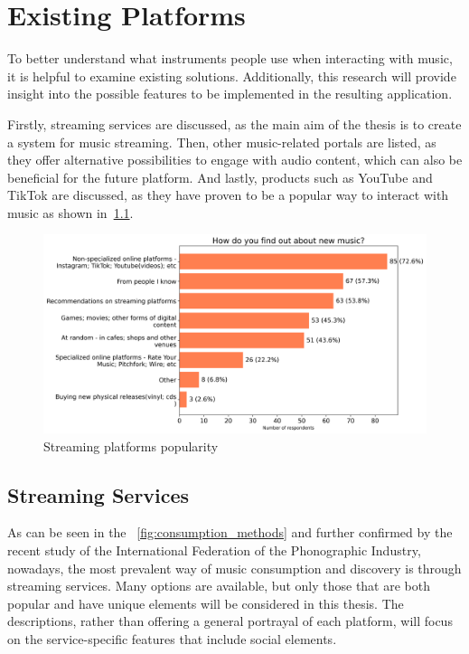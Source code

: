 \chapter{Existing Platforms}\label{chap:platforms}

To better understand what instruments people use when interacting with music,
it is helpful to examine existing solutions. Additionally, this research will provide insight
into the possible features to be implemented in the resulting application.

Firstly, streaming services are discussed, as the main aim of the thesis is to create a system for music streaming.
Then, other music-related portals are listed, as they offer alternative possibilities to engage with audio content, which
can also be beneficial for the future platform.
And lastly, products such as YouTube and TikTok are discussed, as they have proven to be a popular way to interact
with music as shown in~\ref{fig:discovery_methods}.

\begin{figure}[htbp]
    \centering
    \includegraphics[height=0.4\textheight]{charts/discovery methods.png}
    \caption{Streaming platforms popularity}
    \label{fig:discovery_methods}
\end{figure}


\section{Streaming Services}
As can be seen in the ~\ref{fig:consumption_methods} and further confirmed by
the recent study of the International Federation of the Phonographic Industry\cite{music_stats_2024},
nowadays, the most prevalent way of music consumption
and discovery is through streaming services. Many options are available,
but only those that are both popular and have unique elements will be considered in this thesis.
The descriptions, rather than offering a general portrayal of each platform,
will focus on the service-specific features that include social elements.

